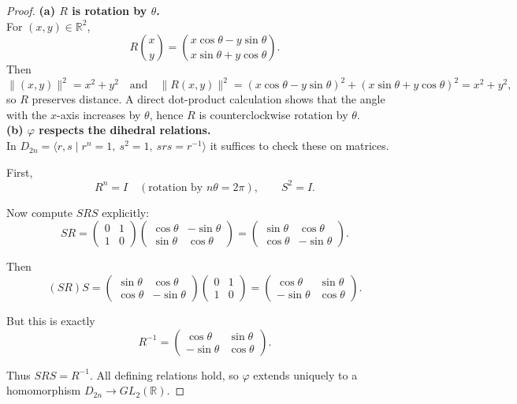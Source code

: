 \documentclass[12pt]{article}
\theoremstyle{definition}
\begin{document}
\begin{proof}
\noindent\textbf{(a) $R$ is rotation by $\theta$.}\\
\noindent For $(x,y)\in\mathbb{R}^2$,
\[
R\binom{x}{y}=\binom{x\cos\theta-y\sin\theta}{x\sin\theta+y\cos\theta}.
\]
Then
\[
\|(x,y)\|^2=x^2+y^2
\quad\text{and}\quad
\big\|R(x,y)\big\|^2=(x\cos\theta-y\sin\theta)^2+(x\sin\theta+y\cos\theta)^2=x^2+y^2,
\]
so $R$ preserves distance. A direct dot-product calculation shows that the angle with the $x$-axis increases by $\theta$, hence $R$ is counterclockwise rotation by $\theta$.\\

\noindent\textbf{(b) $\varphi$ respects the dihedral relations.}\\
In $D_{2n}=\langle r,s\mid r^n=1,\ s^2=1,\ srs=r^{-1}\rangle$ it suffices to check these on matrices.

\smallskip
\noindent First,
\[
R^n=I\quad(\text{rotation by }n\theta=2\pi),\qquad S^2=I.
\]

\noindent Now compute $SRS$ explicitly:
\[
SR=
\begin{pmatrix}0&1\\1&0\end{pmatrix}
\begin{pmatrix}\cos\theta&-\sin\theta\\ \sin\theta&\cos\theta\end{pmatrix}
=
\begin{pmatrix}
\sin\theta & \cos\theta\\
\cos\theta & -\sin\theta
\end{pmatrix}.
\]

Then
\[
(SR)S=
\begin{pmatrix}
\sin\theta & \cos\theta\\
\cos\theta & -\sin\theta
\end{pmatrix}
\begin{pmatrix}0&1\\1&0\end{pmatrix}
=
\begin{pmatrix}
\cos\theta & \sin\theta\\
-\sin\theta & \cos\theta
\end{pmatrix}.
\]

But this is exactly
\[
R^{-1}=
\begin{pmatrix}
\cos\theta & \sin\theta\\
-\sin\theta & \cos\theta
\end{pmatrix}.
\]

Thus $SRS=R^{-1}$. All defining relations hold, so $\varphi$ extends uniquely to a homomorphism $D_{2n}\to GL_2(\mathbb{R})$.



\end{proof}
\end{document}
